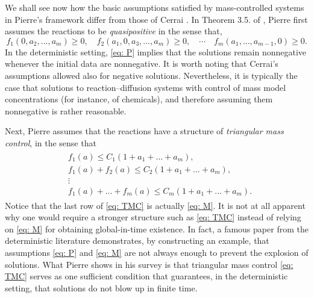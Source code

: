 \documentclass[12pt]{article}
\theoremstyle{definition}
\theoremstyle{remark}
\begin{document}
 We shall see now how the basic assumptions satisfied by mass-controlled systems in Pierre's framework differ from those of Cerrai \cite{cerrai2003stochastic}. In Theorem 3.5. of \cite{pierre2010global}, Pierre first assumes the reactions to be \textit{quasipositive} in the sense that,
\begin{equation*}
    f_1(0,a_2,...,a_m)\geq 0,\quad f_2(a_1,0,a_3,...,a_m)\geq 0, \quad \cdots \quad f_m(a_1,...,a_{m-1},0)\geq 0.\tag{P}\label{eq: P}
\end{equation*}
In the deterministic setting, \eqref{eq: P} implies that the solutions remain nonnegative whenever the initial data are nonnegative. It is worth noting that Cerrai's assumptions \cite{cerrai2003stochastic} allowed also for negative solutions. Nevertheless, it is typically the case that solutions to reaction--diffusion systems with control of mass model concentrations (for instance, of chemicals), and therefore assuming them nonnegative is rather reasonable.

Next, Pierre assumes that the reactions have a structure of \textit{triangular mass control}, in the sense that
\begin{align*}
\begin{split}
    &f_{1}(a)\leq C_1(1+a_1+...+a_m),\\
    &f_1(a)+f_2(a)\leq C_2(1+a_1+...+a_m),\\
    &\vdots\\
    &f_1(a)+...+f_m(a)\leq C_m(1+a_1+...+a_m).
\end{split}
\tag{TMC}\label{eq: TMC}
\end{align*}
Notice that the last row of \eqref{eq: TMC} is actually \eqref{eq: M}. It is not at all apparent why one would require a stronger structure such as \eqref{eq: TMC} instead of relying on \eqref{eq: M} for obtaining global-in-time existence. In fact, a famous paper from the deterministic literature \cite{pierre2000blowup} demonstrates, by constructing an example, that assumptions \eqref{eq: P} and \eqref{eq: M} are not always enough to prevent the explosion of solutions. What Pierre shows in his survey \cite{pierre2010global} is that triangular mass control \eqref{eq: TMC} serves as one sufficient condition that guarantees, in the deterministic setting, that solutions do not blow up in finite time.
\end{document}
